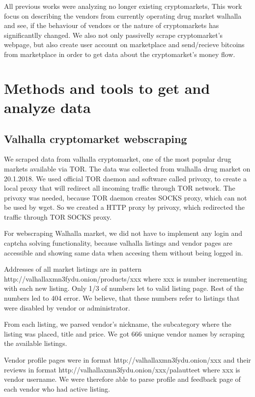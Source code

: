 \documentclass[
  digital, %
  table,   %
  lof,     %
  lot,     %
  oneside
]{fithesis3}
\begin{document}
 All previous works were analyzing no longer existing cryptomarkets,
 This work focus on describing the vendors from currently operating drug market walhalla 
 and see, if the behaviour of vendors or the nature of cryptomarkets
 has significantlly changed. We also not only passivelly scrape cryptomarket's webpage,
 but also create user account on marketplace and send/recieve bitcoins from marketplace
 in order to get data about the cryptomarket's money flow.
 

\chapter{Methods and tools to get and analyze data}

\section{Valhalla cryptomarket webscraping}
We scraped data from valhalla cryptomarket, one of the most popular drug markets available via TOR.
The data was collected from walhalla drug market on 20.1.2018.
We used official TOR daemon and software called privoxy, to create a local proxy that will redirect all
incoming traffic through TOR network. The privoxy was needed, because TOR daemon creates SOCKS proxy,
which can not be used by wget. So we created a HTTP proxy by privoxy, which redirected the traffic through
TOR SOCKS proxy.

For webscraping Walhalla market, we did not have to implement any login and captcha solving functionality,
because valhalla listings and vendor pages are accessible and showing same data when accesing them without being logged in.

Addresses of all market listings are in pattern http://valhallaxmn3fydu.onion/products/xxx where 
xxx is number incrementing with each new listing. Only 1/3 of numbers let to valid listing page.
Rest of the numbers led to 404 error. We believe, that these numbers refer to listings that were disabled by vendor
 or administrator.

From each listing, we parsed vendor's nickname, the subcategory where the listing was placed, title and price.
We got 666 unique vendor names by scraping the available listings.

Vendor profile pages were in format http://valhallaxmn3fydu.onion/xxx and their reviews in format
 http://valhallaxmn3fydu.onion/xxx/palautteet where xxx is vendor username.
 We were therefore able to parse profile and feedback page of each vendor who had active listing. 
 
\end{document}
